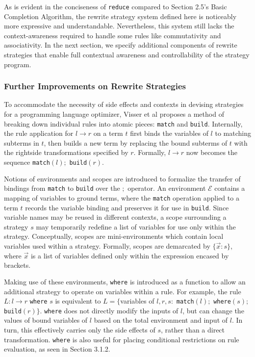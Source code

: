\documentclass{article}
\begin{document}
As is evident in the conciseness of \texttt{reduce} compared to Section 2.5's Basic Completion Algorithm,
the rewrite strategy system defined here is noticeably more expressive and understandable.
Nevertheless, this system still lacks the context-awareness required to handle some rules like commutativity and associativity.
In the next section, we specify additional components of rewrite strategies that enable full contextual awareness
and controllability of the strategy program.

\subsubsection{Further Improvements on Rewrite Strategies}
To accommodate the necessity of side effects and contexts in devising strategies for a programming language optimizer,
Visser et al \cite{elco1998building} proposes a method of breaking down individual rules into atomic pieces: \texttt{match} and \texttt{build}.
Internally, the rule application for $l \rightarrow r$ on a term $t$ first binds the variables of $l$ to matching subterms in $t$,
then builds a new term by replacing the bound subterms of $t$ with the rightside transformations specified by $r$. Formally,
$l \rightarrow r$ now becomes the sequence \texttt{match}$(l);$ \texttt{build}$(r)$.

Notions of environments and scopes are introduced to formalize the transfer of bindings from \texttt{match} to \texttt{build} over the $;$ operator.
An environment $\mathcal{E}$ contains a mapping of variables to ground terms,
where the \texttt{match} operation applied to a term $t$ records the variable binding and preserves it for use in \texttt{build}.
Since variable names may be reused in different contexts, a scope surrounding a strategy $s$ may temporarily redefine a list of variables
for use only within the strategy. Conceptually, scopes are mini-environments which contain local variables used within a strategy.
Formally, scopes are demarcated by $\{\vec{x}: s\}$, where $\vec{x}$ is a list of variables defined only within the expression encased by brackets.

Making use of these environments, \texttt{where} is introduced as a function to allow an additional strategy to operate on variables within a rule.
For example, the rule $L: l \rightarrow r$ \texttt{where} $s$ is equivalent to
$L = \{$variables of $l,r,s:$ \texttt{match}$(l);$ \texttt{where}$(s);$ \texttt{build}$(r)\}$.
\texttt{where} does not directly modify the inputs of $l$,
but can change the values of bound variables of $l$ based on the total environment and input of $l$.
In turn, this effectively carries only the side effects of $s$, rather than a direct transformation.
\texttt{where} is also useful for placing conditional restrictions on rule evaluation, as seen in Section 3.1.2.
\end{document}
